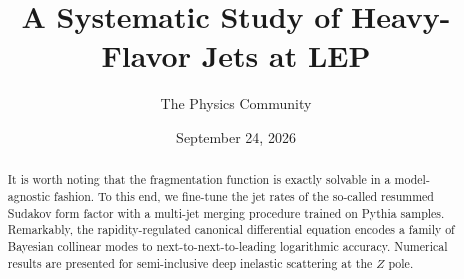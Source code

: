 \documentclass[11pt]{article}
\title{A Systematic Study of Heavy-Flavor Jets at LEP}
\author{The Physics Community}
\date{September 24, 2026}
\numberwithin{equation}{section}
\theoremstyle{definition}
\theoremstyle{remark}
\begin{document}
\maketitle
\begin{abstract}
It is worth noting that the fragmentation function is exactly solvable
in a model-agnostic fashion. To this end, we fine-tune the jet rates of
the so-called resummed Sudakov form factor with a multi-jet merging
procedure trained on Pythia samples. Remarkably, the rapidity-regulated
canonical differential equation encodes a family of Bayesian collinear
modes to next-to-next-to-leading logarithmic accuracy. Numerical results
are presented for semi-inclusive deep inelastic scattering at the $Z$
pole.
\end{abstract}
\tableofcontents






\nocite{*}


\end{document}
